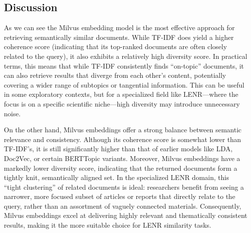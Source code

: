 \documentclass[12pt]{article}
\begin{document}
    \subsection{Discussion}
    As we can see the Milvus embedding model is the most effective approach for retrieving semantically similar documents. While TF-IDF does yield a higher coherence score (indicating that its top-ranked documents are often closely related to the query), it also exhibits a relatively high diversity score. In practical terms, this means that while TF-IDF consistently finds “on-topic” documents, it can also retrieve results that diverge from each other's content, potentially covering a wider range of subtopics or tangential information. This can be useful in some exploratory contexts, but for a specialized field like LENR—where the focus is on a specific scientific niche—high diversity may introduce unnecessary noise.

On the other hand, Milvus embeddings offer a strong balance between semantic relevance and consistency. Although its coherence score is somewhat lower than TF-IDF's, it is still significantly higher than that of earlier models like LDA, Doc2Vec, or certain BERTTopic variants. Moreover, Milvus embeddings have a markedly lower diversity score, indicating that the returned documents form a tightly knit, semantically aligned set. In the specialized LENR domain, this “tight clustering” of related documents is ideal: researchers benefit from seeing a narrower, more focused subset of articles or reports that directly relate to the query, rather than an assortment of vaguely connected materials. Consequently, Milvus embeddings excel at delivering highly relevant and thematically consistent results, making it the more suitable choice for LENR similarity tasks.

    
\end{document}
